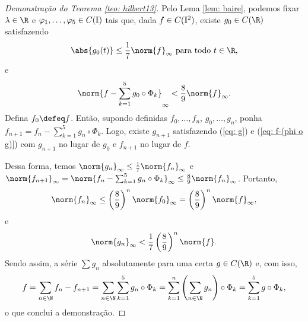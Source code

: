\begin{proof}[Demonstração do Teorema \ref{teo: hilbert13}]
    Pelo Lema \ref{lem: baire}, podemos fixar \( \lambda \in \R \) e \( \varphi_{ 1 }, \dots, \varphi_{ 5 } \in C(\mathbb{I}) \) tais que, dada \( f \in C(\mathbb{I}^2) \), existe \( g_{ 0 } \in C(\R) \) satisfazendo
    \begin{equation}
        \abs{ g_{ 0 }(t) } \leq \frac{ 1 }{ 7 } \norm{ f }_{ \infty } \text{ para todo } t \in \R
        \label{eq: g}
    ,\end{equation}
    e
    \begin{equation}
        \norm{ 
            f -
            \sum_{ k=1 }^{ 5 } g_{ 0 } \circ \Phi_{ k }
         }_{ \infty }
         < \frac{ 8 }{ 9 } \norm{ f }_{ \infty }
         \label{eq: f-(phi o g)}
    .\end{equation}
    Defina \( f_{ 0 } \defeq f \). Então, supondo definidas \( f_{ 0 }, \dots, f_{ n } \), \( g_{ 0 }, \dots, g_{ n } \), ponha \( f_{ n+1 } = f_{ n } - \sum_{ k=1 }^{ 5 } g_{ n } \circ \Phi_{ k } \).
    Logo, existe \( g_{ n+1 } \) satisfazendo (\ref{eq: g}) e (\ref{eq: f-(phi o g)}) com \( g_{ n+1 } \) no lugar de \( g_{ 0 } \) e \( f_{ n+1 } \) no lugar de \( f \).
    
    Dessa forma, temos \( \norm{ g_{ n } }_{ \infty } \leq \frac{ 1 }{ 7 } \norm{ f_{ n } }_{ \infty } \) e \( \norm{ f_{ n+1 } }_{ \infty } = \norm{ f_{ n } - \sum_{ k=1 }^{ 5 } g_{ n } \circ \Phi_{ k } }_{ \infty } \leq \frac{ 8 }{ 9 } \norm{ f_{ n } }_{ \infty } \).
    Portanto, \[
        \norm{ f_{ n } }_{ \infty } \leq \left( \frac{ 8 }{ 9 } \right)^{ n } \norm{ f_{ 0 } }_{ \infty } = \left( \frac{ 8 }{ 9 } \right)^{ n } \norm{ f }_{ \infty }
    ,\]
    e \[
        \norm{ g_{ n } }_{ \infty } <
        \frac{ 1 }{ 7 } \left( \frac{ 8 }{ 9 } \right)^{ n } \norm{ f }
    .\]
    Sendo assim, a série \( \sum g_{ n } \) absolutamente para uma certa \( g \in C(\R) \) e, com isso, \[
        f = \sum_{ n\in\N } f_{ n } - f_{ n+1 }
        = \sum_{ n\in\N } \sum_{ k=1 }^{ 5 } g_{ n } \circ \Phi_{ k }
        = \sum_{ k=1 }^{ n } \left( 
            \sum_{ n\in\N } g_{ n }
         \right)
         \circ \Phi_{ k }
        = \sum_{ k=1 }^{ 5 } g \circ \Phi_{ k }
    ,\]
    o que conclui a demonstração.
\end{proof}
